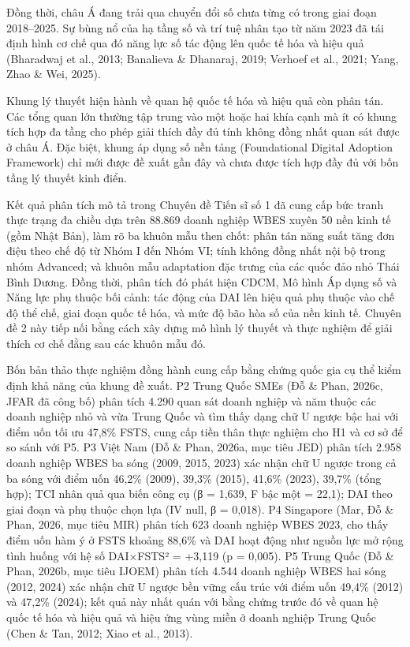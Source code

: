 \documentclass[
  a4paper,
  13pt]{extreport}
\begin{document}
Đồng thời, châu Á đang trải qua chuyển đổi số chưa từng có trong giai
đoạn 2018--2025. Sự bùng nổ của hạ tầng số và trí tuệ nhân tạo từ năm
2023 đã tái định hình cơ chế qua đó năng lực số tác động lên quốc tế hóa
và hiệu quả (Bharadwaj et al., 2013; Banalieva \& Dhanaraj, 2019;
Verhoef et al., 2021; Yang, Zhao \& Wei, 2025).

Khung lý thuyết hiện hành về quan hệ quốc tế hóa và hiệu quả còn phân
tán. Các tổng quan lớn thường tập trung vào một hoặc hai khía cạnh mà ít
có khung tích hợp đa tầng cho phép giải thích đầy đủ tính không đồng
nhất quan sát được ở châu Á. Đặc biệt, khung áp dụng số nền tảng
(Foundational Digital Adoption Framework) chỉ mới được đề xuất gần đây
và chưa được tích hợp đầy đủ với bốn tầng lý thuyết kinh điển.

Kết quả phân tích mô tả trong Chuyên đề Tiến sĩ số 1 đã cung cấp bức
tranh thực trạng đa chiều dựa trên 88.869 doanh nghiệp WBES xuyên 50 nền
kinh tế (gồm Nhật Bản), làm rõ ba khuôn mẫu then chốt: phân tán năng
suất tăng đơn điệu theo chế độ từ Nhóm I đến Nhóm VI; tính không đồng
nhất nội bộ trong nhóm Advanced; và khuôn mẫu adaptation đặc trưng của
các quốc đảo nhỏ Thái Bình Dương. Đồng thời, phân tích đó phát hiện
CDCM, Mô hình Áp dụng số và Năng lực phụ thuộc bối cảnh: tác động của
DAI lên hiệu quả phụ thuộc vào chế độ thể chế, giai đoạn quốc tế hóa, và
mức độ bão hòa số của nền kinh tế. Chuyên đề 2 này tiếp nối bằng cách
xây dựng mô hình lý thuyết và thực nghiệm để giải thích cơ chế đằng sau
các khuôn mẫu đó.

Bốn bản thảo thực nghiệm đồng hành cung cấp bằng chứng quốc gia cụ thể
kiểm định khả năng của khung đề xuất. P2 Trung Quốc SMEs (Đỗ \& Phan,
2026c, JFAR đã công bố) phân tích 4.290 quan sát doanh nghiệp và năm
thuộc các doanh nghiệp nhỏ và vừa Trung Quốc và tìm thấy dạng chữ U
ngược bậc hai với điểm uốn tối ưu 47,8\% FSTS, cung cấp tiền thân thực
nghiệm cho H1 và cơ sở để so sánh với P5. P3 Việt Nam (Đỗ \& Phan,
2026a, mục tiêu JED) phân tích 2.958 doanh nghiệp WBES ba sóng (2009,
2015, 2023) xác nhận chữ U ngược trong cả ba sóng với điểm uốn 46,2\%
(2009), 39,3\% (2015), 41,6\% (2023), 39,7\% (tổng hợp); TCI nhân quả
qua biến công cụ (β = 1,639, F bậc một = 22,1); DAI theo giai đoạn và
phụ thuộc chọn lựa (IV null, β = 0,018). P4 Singapore (Mar, Đỗ \& Phan,
2026, mục tiêu MIR) phân tích 623 doanh nghiệp WBES 2023, cho thấy điểm
uốn hàm ý ở FSTS khoảng 88,6\% và DAI hoạt động như nguồn lực mở rộng
tình huống với hệ số DAI×FSTS² = +3,119 (p = 0,005). P5 Trung Quốc (Đỗ
\& Phan, 2026b, mục tiêu IJOEM) phân tích 4.544 doanh nghiệp WBES hai
sóng (2012, 2024) xác nhận chữ U ngược bền vững cấu trúc với điểm uốn
49,4\% (2012) và 47,2\% (2024); kết quả này nhất quán với bằng chứng
trước đó về quan hệ quốc tế hóa và hiệu quả và hiệu ứng vùng miền ở
doanh nghiệp Trung Quốc (Chen \& Tan, 2012; Xiao et al., 2013).
\end{document}
